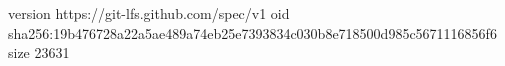 version https://git-lfs.github.com/spec/v1
oid sha256:19b476728a22a5ae489a74eb25e7393834c030b8e718500d985c5671116856f6
size 23631
